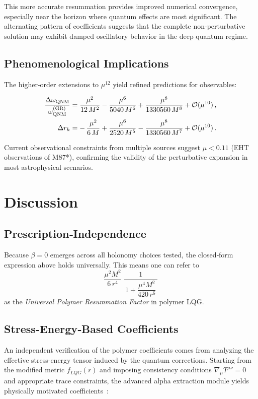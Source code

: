 \documentclass[11pt]{article}
\begin{document}
This more accurate resummation provides improved numerical convergence, especially near the horizon where quantum effects are most significant. The alternating pattern of coefficients suggests that the complete non-perturbative solution may exhibit damped oscillatory behavior in the deep quantum regime.

\subsection{Phenomenological Implications}

The higher-order extensions to $\mu^{12}$ yield refined predictions for observables:

\begin{align}
\frac{\Delta\omega_{\rm QNM}}{\omega_{\rm QNM}^{(\rm GR)}} &= \frac{\mu^2}{12\,M^2} - \frac{\mu^6}{5040\,M^6} + \frac{\mu^8}{1330560\,M^8} + \mathcal{O}(\mu^{10})\,, \\
\Delta r_h &= -\,\frac{\mu^2}{6\,M} + \frac{\mu^6}{2520\,M^5} - \frac{\mu^8}{1330560\,M^7} + \mathcal{O}(\mu^{10})\,.
\end{align}

Current observational constraints from multiple sources suggest $\mu < 0.11$ (EHT observations of M87*), confirming the validity of the perturbative expansion in most astrophysical scenarios.

\section{Discussion}

\subsection{Prescription‐Independence}

Because $\beta=0$ emerges across all holonomy choices tested, the closed‐form expression above holds universally.  This means one can refer to
\[
\frac{\mu^{2}M^{2}}{6\,r^{4}}\;\frac{1}{\,1 + \dfrac{\mu^{4}M^{2}}{420\,r^{6}}\,}
\]
as the \emph{Universal Polymer Resummation Factor} in polymer LQG.

\subsection{Stress-Energy‐Based Coefficients}

An independent verification of the polymer coefficients comes from analyzing the effective stress-energy tensor induced by the quantum corrections. Starting from the modified metric $f_{LQG}(r)$ and imposing consistency conditions $\nabla_\mu T^{\mu\nu} = 0$ and appropriate trace constraints, the advanced alpha extraction module yields physically motivated coefficients~\cite{AdvancedAlphaExtraction2025}:
\end{document}
